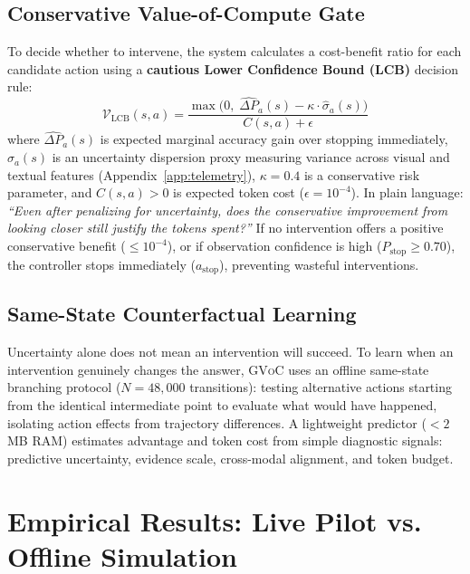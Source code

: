 \documentclass[11pt]{article}
\begin{document}
\subsection{Conservative Value-of-Compute Gate}
To decide whether to intervene, the system calculates a cost-benefit ratio for each candidate action using a \textbf{cautious Lower Confidence Bound (LCB)} decision rule:
\vspace{-1.5mm}
\begin{equation}
\label{eq:voc_ratio}
\mathcal{V}_{\text{LCB}}(s, a) = \frac{\max\big(0,\; \hat{\Delta P}_a(s) - \kappa \cdot \hat{\sigma}_a(s)\big)}{C(s, a) + \epsilon}
\end{equation}
\vspace{-1.5mm}
where $\hat{\Delta P}_a(s)$ is expected marginal accuracy gain over stopping immediately, $\hat{\sigma}_a(s)$ is an uncertainty dispersion proxy measuring variance across visual and textual features (Appendix~\ref{app:telemetry}), $\kappa = 0.4$ is a conservative risk parameter, and $C(s, a) > 0$ is expected token cost ($\epsilon = 10^{-4}$). In plain language: \textit{``Even after penalizing for uncertainty, does the conservative improvement from looking closer still justify the tokens spent?''} If no intervention offers a positive conservative benefit ($\le 10^{-4}$), or if observation confidence is high ($P_{\text{stop}} \ge 0.70$), the controller stops immediately ($a_{\text{stop}}$), preventing wasteful interventions.

\subsection{Same-State Counterfactual Learning}
Uncertainty alone does not mean an intervention will succeed. To learn when an intervention genuinely changes the answer, \textsc{GVoC} uses an offline same-state branching protocol ($N = 48,000$ transitions): testing alternative actions starting from the identical intermediate point to evaluate what would have happened, isolating action effects from trajectory differences. A lightweight predictor ($<2$ MB RAM) estimates advantage and token cost from simple diagnostic signals: predictive uncertainty, evidence scale, cross-modal alignment, and token budget.

\section{Empirical Results: Live Pilot vs. Offline Simulation}
\label{sec:experiments}
\end{document}
